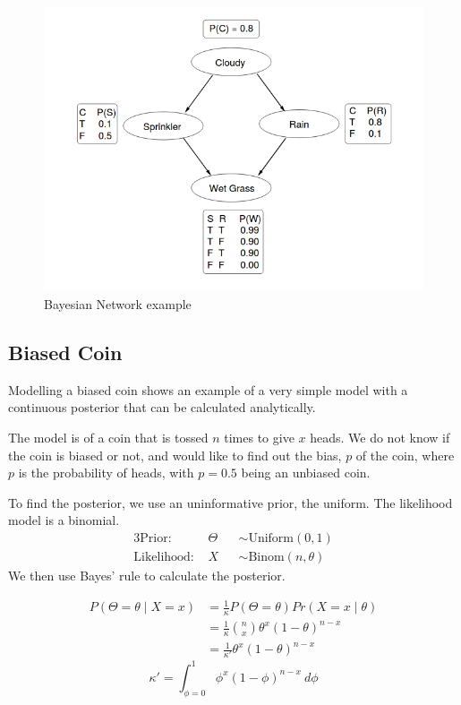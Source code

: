 \begin{figure}[!htb]
	\centering
	\includegraphics[width=\textwidth]{figs/sprinkler-network.png}
	\caption{Bayesian Network example}
	\label{fig:sprinkler-network}
\end{figure}

\subsection{Biased Coin}
Modelling a biased coin shows an example of a very simple model with a continuous posterior that can be calculated analytically\cite{datasci}. 

The model is of a coin that is tossed $n$ times to give $x$ heads. We do not know if the coin is biased or not, and would like to find out the bias, $p$ of the coin, where $p$ is the probability of heads, with $p=0.5$ being an unbiased coin.


To find the posterior, we use an uninformative prior, the uniform. The likelihood model is a binomial.
% 
\begin{alignat*}{3}
	\text{Prior:~}      & \Theta &   & \sim \text{Uniform}(0,1)    \\
	\text{Likelihood:~} & X      &   & \sim \text{Binom}(n,\theta) 
\end{alignat*}
% 
We then use Bayes' rule to calculate the posterior.
			    
\begin{align*}						
	P(\Theta=\theta \mid X=x) & = \frac{1}{\kappa}P(\Theta=\theta)Pr(X=x\mid\theta)       \\ 
	                          & = \frac{1}{\kappa}{{n}\choose{x}}\theta^x(1-\theta)^{n-x} \\
	                          & = \frac{1}{\kappa'}\theta^x(1-\theta)^{n-x}               
\end{align*}
$$\kappa'=\int_{\phi=0}^1\phi^x(1-\phi)^{n-x}~d\phi$$                        

